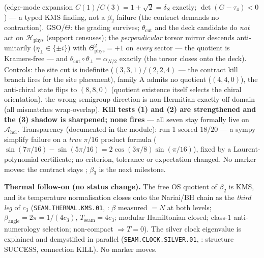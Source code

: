 \documentclass[11pt,a4paper]{article}
\begin{document}
(edge-mode expansion $C(1)/C(3) = 1 + \sqrt2 = \delta_S$ exactly; $\det(G - \tau_4) < 0$) ---
a typed KMS finding, not a $\beta_2$ failure (the contract demands no contraction).
GSO/$\Theta$: the grading survives; $\theta_{\mathrm{cut}}$ and the deck candidate do
\emph{not} act on $\mathcal H_{\mathrm{phys}}$ (support censuses); the \emph{perpendicular}
torsor mirror descends anti-unitarily ($\eta_\perp \in \{\pm i\}$) with
$\Theta_{\mathrm{phys}}^2 = +1$ on \emph{every} sector --- the quotient is Kramers-free ---
and $\theta_{\mathrm{cut}}\circ\theta_\perp = \alpha_{N/2}$ exactly (the torsor closes onto
the deck). Controls: the site cut is indefinite ($(3,3,1)/(2,2,4)$ --- the contract kill
branch fires for the site placement), family A admits no quotient ($(4,4,0)$), the
anti-chiral state flips to $(8,8,0)$ (quotient existence itself selects the chiral
orientation), the wrong semigroup direction is non-Hermitian exactly off-domain (all
mismatches wrap-overlap). \textbf{Kill tests (1) and (2) are strengthened and the (3) shadow
is sharpened; none fires} --- all seven stay formally live on
$\mathcal A_{\mathrm{hol}}$. Transparency (documented in the module): run 1 scored $18/20$
--- a sympy simplify failure on a \emph{true} $\pi/16$ product formula
($\sin(7\pi/16) - \sin(5\pi/16) = 2\cos(3\pi/8)\sin(\pi/16)$), fixed by a Laurent-polynomial
certificate; no criterion, tolerance or expectation changed. No marker moves: the contract
stays \mO; $\beta_3$ is the next milestone.

\par\smallskip\noindent\textbf{Thermal follow-on (no status change).} The free OS quotient of
$\beta_2$ is KMS, and its temperature normalisation closes onto the Nariai/BH chain as the
\emph{third leg} of $c_3$ (\texttt{SEAM.THERMAL.KMS.01},
: $\beta$ measured $=N$ at both levels;
$\beta_{\mathrm{angle}}=2\pi=1/(4c_3)$, $T_{\mathrm{seam}}=4c_3$; modular Hamiltonian closed;
class-$1$ anti-numerology selection; non-compact $\Rightarrow T=0$). The silver clock
eigenvalue is explained and demystified in parallel (\texttt{SEAM.CLOCK.SILVER.01},
: structure SUCCESS, connection KILL). No marker
moves.
\end{document}
